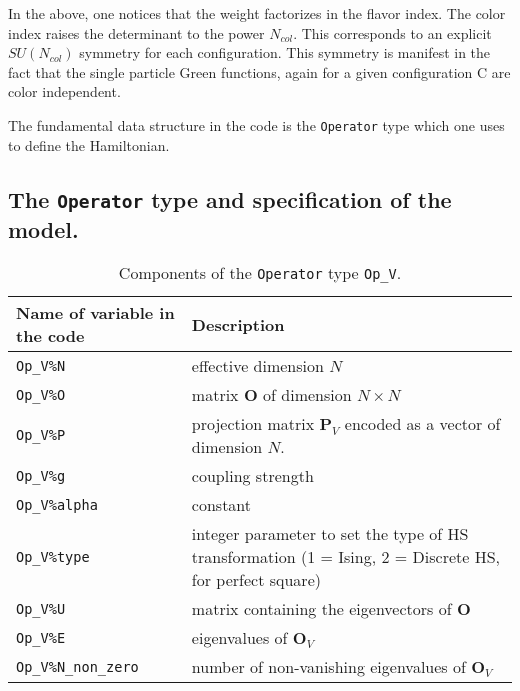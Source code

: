 In the above, one notices that the weight factorizes in  the flavor index. The color index raises the determinant to the power $N_{col}$. This corresponds to  an explicit $SU(N_{col})$ symmetry   for each  configuration. This symmetry is manifest in the fact that the single particle  Green functions, again for a given  configuration C are color independent. 


The fundamental data structure in the code is the \texttt{Operator} type  which one uses to define the Hamiltonian.    

\subsection{The \texttt{Operator} type and specification of the model.}
\begin{table}[h]
   \begin{tabular}{l l}
    Name of variable in the code & Description \\\hline
    \texttt{Op\_V\%N}            &  effective dimension $N$ \\
    \texttt{Op\_V\%O}            &  matrix  $\mathbf{O}$  of dimension $N \times N$\\
    \texttt{Op\_V\%P}            &  projection matrix $\mathbf{P}_{V}$  encoded as a vector of dimension $N$.\\
     \texttt{Op\_V\%g}            &  coupling strength  \\  
    \texttt{Op\_V\%alpha}      &  constant \\
    \texttt{Op\_V\%type}        &  integer parameter to set the type of 
                                             HS transformation   (1 = Ising, 2 = Discrete HS, for perfect square)  \\ 
    \texttt{Op\_V\%U}            &  matrix containing the eigenvectors of $\mathbf{O}$  \\
    \texttt{Op\_V\%E}            &  eigenvalues of $\mathbf{O}_{V}$ \\
    \texttt{Op\_V\%N\_non\_zero} &  number of non-vanishing eigenvalues of $\mathbf{O}_{V}$ 
   \end{tabular}
   \caption{Components of the \texttt{Operator}  type \texttt{Op\_V}.
    \label{Operator.type}}
\end{table}


